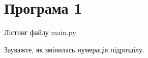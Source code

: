 \label{appendix:A}

\section{Програма 1}

Лістинг файлу main.py





Зауважте, як змінилась нумерація підрозділу.
